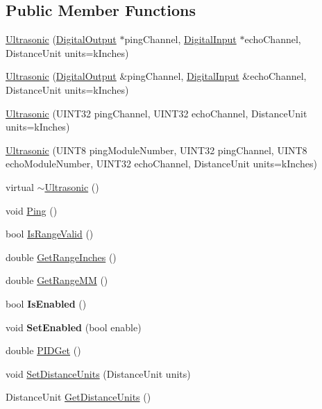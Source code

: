 \subsection*{Public Member Functions}
\begin{DoxyCompactItemize}
\item 
\hyperlink{classUltrasonic_aefd7583faa56df3a6c1a4fc38d3752e2}{Ultrasonic} (\hyperlink{classDigitalOutput}{DigitalOutput} $\ast$pingChannel, \hyperlink{classDigitalInput}{DigitalInput} $\ast$echoChannel, DistanceUnit units=kInches)
\item 
\hyperlink{classUltrasonic_a5089d8a662c2b13f9bb15d6d36f11e36}{Ultrasonic} (\hyperlink{classDigitalOutput}{DigitalOutput} \&pingChannel, \hyperlink{classDigitalInput}{DigitalInput} \&echoChannel, DistanceUnit units=kInches)
\item 
\hyperlink{classUltrasonic_a2c89013dc7050dc8a99f6eaf9b664482}{Ultrasonic} (UINT32 pingChannel, UINT32 echoChannel, DistanceUnit units=kInches)
\item 
\hyperlink{classUltrasonic_a17277044596d5b3a519df2c059b46974}{Ultrasonic} (UINT8 pingModuleNumber, UINT32 pingChannel, UINT8 echoModuleNumber, UINT32 echoChannel, DistanceUnit units=kInches)
\item 
virtual \hyperlink{classUltrasonic_ab5066b2bfeac723140c18b9f8340abad}{$\sim$Ultrasonic} ()
\item 
void \hyperlink{classUltrasonic_aff9a83272ddaf8579ce2434e20f0b965}{Ping} ()
\item 
bool \hyperlink{classUltrasonic_a765c830f4ff4c68e83de2f14d43fa54c}{IsRangeValid} ()
\item 
double \hyperlink{classUltrasonic_a73c80fe92b2085107714c6a110d90d70}{GetRangeInches} ()
\item 
double \hyperlink{classUltrasonic_af35c9a3273f1ffcf0eb17308d986d7c0}{GetRangeMM} ()
\item 
\hypertarget{classUltrasonic_a5ff4ef91ebe488a3a30658b23fd846fa}{
bool {\bfseries IsEnabled} ()}
\label{classUltrasonic_a5ff4ef91ebe488a3a30658b23fd846fa}

\item 
\hypertarget{classUltrasonic_aa3e3a0dc833cc2549026e6d3c3d7fe47}{
void {\bfseries SetEnabled} (bool enable)}
\label{classUltrasonic_aa3e3a0dc833cc2549026e6d3c3d7fe47}

\item 
double \hyperlink{classUltrasonic_a8ec6de749ccd7e93b28735e9cc6d0b22}{PIDGet} ()
\item 
void \hyperlink{classUltrasonic_a0fc0d0787d943c45e04194727addaac0}{SetDistanceUnits} (DistanceUnit units)
\item 
DistanceUnit \hyperlink{classUltrasonic_aac979c8a612ef86912989a782f7dd634}{GetDistanceUnits} ()
\end{DoxyCompactItemize}
